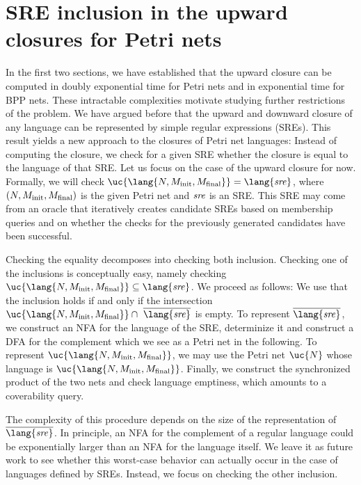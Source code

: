 \documentclass[../../diss.tex]{subfiles}
\begin{document}
\section{SRE inclusion in the upward closures for Petri nets}%
\label{Section:PNSREUC}%

In the first two sections, we have established that the upward closure can be computed in doubly exponential time for Petri nets and in exponential time for BPP nets.
These intractable complexities motivate studying further restrictions of the problem.
We have argued before that the upward and downward closure of any language can be represented by simple regular expressions (SREs).
This result yields a new approach to the closures of Petri net languages:
Instead of computing the closure, we check for a given SRE whether the closure is equal to the language of that SRE.\@
Let us focus on the case of the upward closure for now.
Formally, we will check $\uc{\lang{N,M_\init,M_\final}} = \lang{\sre}$, where $(N,M_{\text{init}},M_{\text{final}})$ is the given Petri net and $\mathit{sre}$ is an SRE.\@
This SRE may come from an oracle that iteratively creates candidate SREs based on membership queries and on whether the checks for the previously generated candidates have been successful.

Checking the equality decomposes into checking both inclusion.
Checking one of the inclusions is conceptually easy, namely checking $\mathmbox{\uc{\lang{N,M_\init,M_\final}}} \subseteq \lang{\sre}$.
We proceed as follows:
We use that the inclusion holds if and only if the intersection $\uc{\lang{N,M_\init,M_\final}} \cap \ \overline{\lang{\sre}}$ is empty.
To represent $\overline{\lang{\sre}}$, we construct an NFA for the language of the SRE, determinize it and construct a DFA for the complement which we see as a Petri net in the following.
To represent $\uc{\lang{N,M_\init,M_\final}}$, we may use the Petri net $\uc{N}$ whose language is $\uc{\lang{N,M_\init,M_\final}}$.
Finally, we construct the synchronized product of the two nets and check language emptiness, which amounts to a coverability query.

The complexity of this procedure depends on the size of the representation of $\overline{\lang{\sre}}$.
In principle, an NFA for the complement of a regular language could be exponentially larger than an NFA for the language itself.
We leave it as future work to see whether this worst-case behavior can actually occur in the case of languages defined by SREs.
Instead, we focus on checking the other inclusion.
\end{document}
